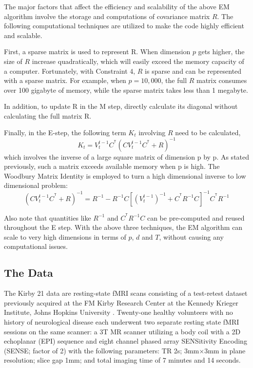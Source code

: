 \documentclass[fleqn]{article}
\newcommand{\T}{^{\ensuremath{\mathsf{T}}}}           %
\begin{document}
The major factors that affect the efficiency and scalability of the above EM algorithm involve the storage and computations of covariance matrix $R$. The following computational techniques are utilized to make the code highly efficient and scalable.

First, a sparse matrix is used to represent R. When dimension $p$ gets higher, the size of $R$ increase quadratically, which will easily exceed the memory capacity of a computer.  Fortunately, with Constraint 4, $R$ is sparse and can be represented with a sparse matrix. For example, when $p=10,000$, the full $R$ matrix consumes over 100 gigabyte of memory, while the sparse matrix takes less than 1 megabyte.

In addition, to update R in the M step, directly calculate its diagonal without calculating the full matrix R.

Finally, in the E-step, the following term $K_t$ involving $R$ need to be calculated,
\[
K_t=V_t^{t-1}C^{\T}(CV_t^{t-1}C^{\T}+R)^{-1}
\]
which involves the inverse of a large square matrix of dimension p by p. As stated previously, such a matrix exceeds available memory when p is high. The Woodbury Matrix Identity is employed to turn a high dimensional inverse to low dimensional problem:
\[
(CV_t^{t-1}C^{\T}+R)^{-1} = R^{-1} - R^{-1}C[(V_t^{t-1})^{-1} + C^{\T}R^{-1}C]^{-1}C^{\T}R^{-1}
\]

Also note that quantities like $R^{-1}$ and $C^{\T}R^{-1}C$ can be pre-computed and reused throughout the E step. With the above three techniques, the EM algorithm can scale to very high dimensions in terms of $p$, $d$ and $T$, without causing any computational issues.

\subsection{The Data}

The Kirby 21 data are resting-state fMRI scans consisting of a test-retest dataset previously acquired at the FM Kirby Research Center at the Kennedy Krieger Institute, Johns Hopkins University \cite{landman2011multi}. Twenty-one healthy volunteers with no history of neurological disease each underwent two separate resting state fMRI sessions on the same scanner: a 3T MR scanner utilizing a body coil with a 2D echoplanar (EPI) sequence and eight channel phased array SENSitivity Encoding (SENSE; factor of 2) with the following parameters: TR 2s; 3mm$\times$3mm in plane resolution; slice gap 1mm; and total imaging time of 7 minutes and 14 seconds.
\end{document}
